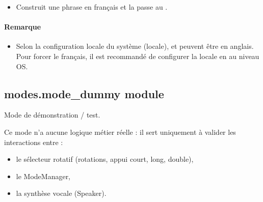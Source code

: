 \documentclass[letterpaper,10pt,french]{sphinxmanual}
\begin{document}
\begin{fulllineitems}
\begin{fulllineitems}
\begin{itemize}
\begin{description}
\begin{itemize}
\item {} 
\sphinxAtStartPar
jour du mois       :  (converti en int pour éviter les zéros en tête)

\item {} 
\sphinxAtStartPar
mois               : 

\item {} 
\sphinxAtStartPar
année              : 

\end{itemize}

\end{description}

\item {} 
\sphinxAtStartPar
Construit une phrase en français et la passe au .

\end{itemize}


\paragraph{Remarque}
\label{\detokenize{api/modes:remarque}}\begin{itemize}
\item {} 
\sphinxAtStartPar
Selon la configuration locale du système (locale),
 et  peuvent être en anglais. Pour forcer le français,
il est recommandé de configurer la locale en  au niveau OS.

\end{itemize}

\end{fulllineitems}


\end{fulllineitems}



\subsection{modes.mode\_dummy module}
\label{\detokenize{api/modes:module-modes.mode_dummy}}\label{\detokenize{api/modes:modes-mode-dummy-module}}
\sphinxAtStartPar
Mode de démonstration / test.

\sphinxAtStartPar
Ce mode n’a aucune logique métier réelle : il sert uniquement
à valider les interactions entre :
\begin{itemize}
\item {} 
\sphinxAtStartPar
le sélecteur rotatif (rotations, appui court, long, double),

\item {} 
\sphinxAtStartPar
le ModeManager,

\item {} 
\sphinxAtStartPar
la synthèse vocale (Speaker).

\end{itemize}
\end{document}
